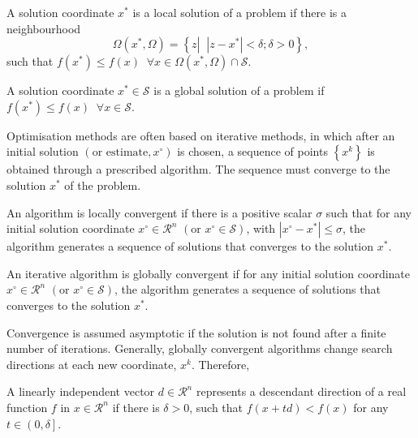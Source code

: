 \begin{defn}
   A solution coordinate $x^{\ast}$ is a local solution of a problem if there is a neighbourhood 
   \begin{displaymath}
           \Omega\left(x^{\ast},\Omega\right) = \left\{ z \left|\;\;\left|z-x^{\ast}\right| < \delta ; \delta > 0\right.\right\},
   \end{displaymath}
   such that $f\left(x^{\ast}\right)\leq f\left(x\right)\;\;\forall x\in\Omega\left(x^{\ast},\Omega\right) \cap \mathcal{S}$.
\end{defn}

\begin{defn}
   A solution coordinate $x^{\ast}\in\mathcal{S}$ is a global solution of a problem if $f\left(x^{\ast}\right)\leq f\left(x\right)\;\;\forall x\in\mathcal{S}$.
\end{defn}

\bigskip
Optimisation methods are often based on iterative methods, in which after an initial solution $\left(\text{or estimate}, x^{\circ}\right)$ is chosen, a sequence of points $\left\{x^{k}\right\}$ is obtained through a prescribed algorithm. The sequence must converge to the solution $x^{\ast}$ of the problem.
\begin{defn}
   An algorithm is locally convergent if there is a positive scalar $\sigma$ such that for any initial solution coordinate $x^{\circ}\in\mathcal{R}^{n}$ $\left(\text{or } x^{\circ}\in\mathcal{S}\right)$, with $\left|x^{\circ}-x^{\ast}\right|\leq\sigma$, the algorithm generates a sequence of solutions that converges to the solution $x^{\ast}$.
\end{defn}

\begin{defn}
   An iterative algorithm is globally convergent if for any initial solution coordinate $x^{\circ}\in\mathcal{R}^{n}$ $\left(\text{or } x^{\circ}\in\mathcal{S}\right)$, the algorithm generates a sequence of solutions that converges to the solution $x^{\ast}$.
\end{defn}

\bigskip
Convergence is assumed asymptotic if the solution is not found after a finite number of iterations. Generally, globally convergent algorithms change search directions at each new coordinate, $x^{k}$. Therefore,

\begin{defn} A linearly independent vector $d\in\mathcal{R}^{n}$ represents a descendant direction of a real function $f$ in $x\in\mathcal{R}^{n}$ if there is $\delta>0$, such that $f\left(x+t d\right)<f\left(x\right)$ for any $t\in\left.\left(0,\delta\right.\right]$.   
\end{defn}

